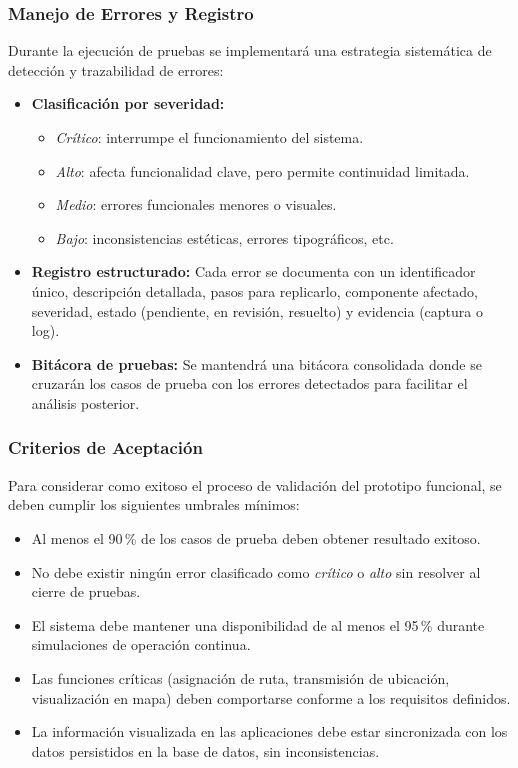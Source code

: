 \documentclass[12pt]{article}
\begin{document}
\subsubsection*{Manejo de Errores y Registro}

Durante la ejecución de pruebas se implementará una estrategia sistemática de detección y trazabilidad de errores:

\begin{itemize}
    \item \textbf{Clasificación por severidad:}
    \begin{itemize}
        \item \textit{Crítico}: interrumpe el funcionamiento del sistema.
        \item \textit{Alto}: afecta funcionalidad clave, pero permite continuidad limitada.
        \item \textit{Medio}: errores funcionales menores o visuales.
        \item \textit{Bajo}: inconsistencias estéticas, errores tipográficos, etc.
    \end{itemize}
    \item \textbf{Registro estructurado:} Cada error se documenta con un identificador único, descripción detallada, pasos para replicarlo, componente afectado, severidad, estado (pendiente, en revisión, resuelto) y evidencia (captura o log).
    \item \textbf{Bitácora de pruebas:} Se mantendrá una bitácora consolidada donde se cruzarán los casos de prueba con los errores detectados para facilitar el análisis posterior.
\end{itemize}

\subsubsection*{Criterios de Aceptación}

Para considerar como exitoso el proceso de validación del prototipo funcional, se deben cumplir los siguientes umbrales mínimos:

\begin{itemize}
    \item Al menos el 90\,\% de los casos de prueba deben obtener resultado exitoso.
    \item No debe existir ningún error clasificado como \textit{crítico} o \textit{alto} sin resolver al cierre de pruebas.
    \item El sistema debe mantener una disponibilidad de al menos el 95\,\% durante simulaciones de operación continua.
    \item Las funciones críticas (asignación de ruta, transmisión de ubicación, visualización en mapa) deben comportarse conforme a los requisitos definidos.
    \item La información visualizada en las aplicaciones debe estar sincronizada con los datos persistidos en la base de datos, sin inconsistencias.
\end{itemize}
\end{document}
